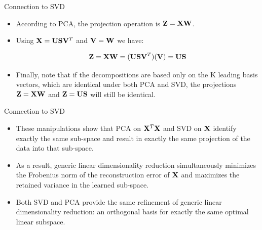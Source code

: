 \documentclass[serif,xcolor=pdftex,dvipsnames,table,hyperref={bookmarks=false,breaklinks}]{beamer}
\begin{document}
\begin{frame}[t]{Connection to SVD}

\begin{itemize}

\item According to PCA, the projection operation is 
${\mathbf{Z}}={\mathbf{X}}{\mathbf{W}}$. 

\pause\item Using ${\mathbf{X}} = {\mathbf{U}}{\mathbf{S}}{\mathbf{V}}^T$ and 
${\mathbf{V}}={\mathbf{W}}$ we have:

$${\mathbf{Z}}={\mathbf{X}}{\mathbf{W}} = ({\mathbf{U}}{\mathbf{S}}{\mathbf{V}}^T)({\mathbf{V}}) = {\mathbf{U}}{\mathbf{S}}$$ 

\pause\item Finally, note that if the decompositions are based only on the K 
leading basis vectors, which are identical under both PCA and SVD, the 
projections ${\mathbf{Z}}={\mathbf{X}}{\mathbf{W}}$ and ${\mathbf{Z}}={\mathbf{U}}{\mathbf{S}}$ will still be 
identical.

\end{itemize} 
\end{frame}

\begin{frame}[t]{Connection to SVD}

\begin{itemize}
\item These manipulations show that PCA on ${\mathbf{X}}^T{\mathbf{X}}$ and SVD on 
${\mathbf{X}}$ identify exactly the same sub-space and result in exactly the same 
projection of the data into that sub-space.

\pause\item As a result, generic linear dimensionality reduction 
simultaneously minimizes the Frobenius norm of the reconstruction error of 
${\mathbf{X}}$ and maximizes the retained variance in the learned sub-space.

\pause\item Both SVD and PCA provide the same refinement of generic linear 
dimensionality reduction: an orthogonal basis for exactly the same optimal 
linear subspace. 

\end{itemize} 
\end{frame}
\end{document}

